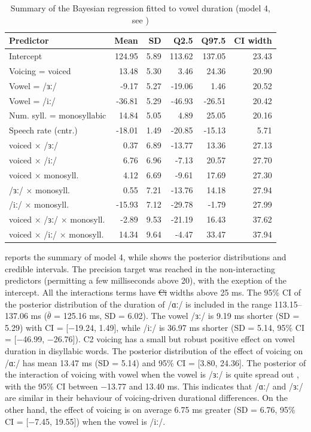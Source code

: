 \documentclass[12pt,a4paper,]{article}
\providecommand{\DIFaddtex}[1]{{\protect\color{blue}\uwave{#1}}} %
\providecommand{\DIFdeltex}[1]{{\protect\color{red}\sout{#1}}}                      %
\providecommand{\DIFaddbegin}{} %
\providecommand{\DIFaddend}{} %
\providecommand{\DIFdelbegin}{} %
\providecommand{\DIFdelend}{} %
\providecommand{\DIFadd}[1]{\texorpdfstring{\DIFaddtex{#1}}{#1}} %
\providecommand{\DIFdel}[1]{\texorpdfstring{\DIFdeltex{#1}}{}} %
\newcommand{\DIFscaledelfig}{0.5}
\newlength{\DIFdelgraphicswidth} %
\newlength{\DIFdelgraphicsheight} %
\newcommand{\DIFaddincludegraphics}[2][]{{\color{blue}\fbox{\DIFOincludegraphics[#1]{#2}}}} %
\newcommand{\DIFdelincludegraphics}[2][]{%
\sbox{\DIFdelgraphicsbox}{\DIFOincludegraphics[#1]{#2}}%
\settoboxwidth{\DIFdelgraphicswidth}{\DIFdelgraphicsbox} %
\settoboxtotalheight{\DIFdelgraphicsheight}{\DIFdelgraphicsbox} %
\scalebox{\DIFscaledelfig}{%
\parbox[b]{\DIFdelgraphicswidth}{\usebox{\DIFdelgraphicsbox}\\[-\baselineskip] \rule{\DIFdelgraphicswidth}{0em}}\llap{\resizebox{\DIFdelgraphicswidth}{\DIFdelgraphicsheight}{%
\setlength{\unitlength}{\DIFdelgraphicswidth}%
\begin{picture}(1,1)%
\thicklines\linethickness{2pt} %
{\color[rgb]{1,0,0}\put(0,0){\framebox(1,1){}}}%
{\color[rgb]{1,0,0}\put(0,0){\line( 1,1){1}}}%
{\color[rgb]{1,0,0}\put(0,1){\line(1,-1){1}}}%
\end{picture}%
}\hspace*{3pt}}} %
} %
\DeclareRobustCommand{\DIFaddbegin}{\DIFOaddbegin \let\includegraphics\DIFaddincludegraphics} %
\DeclareRobustCommand{\DIFaddend}{\DIFOaddend \let\includegraphics\DIFOincludegraphics} %
\DeclareRobustCommand{\DIFdelbegin}{\DIFOdelbegin \let\includegraphics\DIFdelincludegraphics} %
\DeclareRobustCommand{\DIFdelend}{\DIFOaddend \let\includegraphics\DIFOincludegraphics} %
\begin{document}
\begin{table}[t]

\caption{\label{tab:vow-4-table}Summary of the Bayesian regression fitted to vowel duration (model 4, see )}
\centering
\fontsize{8}{10}\selectfont
\begin{tabular}{lrrrrr}
\toprule
Predictor & Mean & SD & Q2.5 & Q97.5 & CI width\\
\midrule
Intercept & 124.95 & 5.89 & 113.62 & 137.05 & 23.43\\
Voicing = voiced & 13.48 & 5.30 & 3.46 & 24.36 & 20.90\\
Vowel = /ɜː/ & -9.17 & 5.27 & -19.06 & 1.46 & 20.52\\
Vowel = /iː/ & -36.81 & 5.29 & -46.93 & -26.51 & 20.42\\
Num. syll. = monosyllabic & 14.84 & 5.05 & 4.89 & 25.05 & 20.16\\
Speech rate (cntr.) & -18.01 & 1.49 & -20.85 & -15.13 & 5.71\\
voiced × /ɜː/ & 0.37 & 6.89 & -13.77 & 13.36 & 27.13\\
voiced × /iː/ & 6.76 & 6.96 & -7.13 & 20.57 & 27.70\\
voiced × monosyll. & 4.12 & 6.69 & -9.61 & 17.69 & 27.30\\
/ɜː/ × monosyll. & 0.55 & 7.21 & -13.76 & 14.18 & 27.94\\
/iː/ × monosyll. & -15.93 & 7.12 & -29.78 & -1.79 & 27.99\\
voiced × /ɜː/ × monosyll. & -2.89 & 9.53 & -21.19 & 16.43 & 37.62\\
voiced × /iː/ × monosyll. & 14.34 & 9.64 & -4.47 & 33.47 & 37.94\\
\bottomrule
\end{tabular}
\end{table}

 reports the summary of model 4, while
 shows the posterior distributions and credible
intervals. The precision target was reached in the non-interacting
predictors (permitting a few milliseconds above 20), with the exeption
of the intercept. All the interactions terms have \DIFdelbegin \DIFdel{Ci }\DIFdelend \DIFaddbegin \DIFadd{CI }\DIFaddend widths above 25 ms.
The 95\% CI of the posterior distribution of the duration of /ɑː/ is
included in the range 113.15--137.06 ms (\(\bar{\theta}\) = 125.16 ms,
SD = 6.02). The vowel /ɜː/ is 9.19 ms shorter (SD = 5.29) with CI =
{[}−19.24, 1.49{]}, while /iː/ is 36.97 ms shorter (SD = 5.14, 95\% CI =
{[}−46.99, −26.76{]}). C2 voicing has a small but robust positive effect
on vowel duration in disyllabic words. The posterior distribution of the
effect of voicing on /ɑː/ has mean 13.47 ms (SD = 5.14) and 95\% CI =
{[}3.80, 24.36{]}. The posterior of the interaction of voicing with
vowel when the vowel is /ɜː/ is quite spread out \DIFaddbegin \DIFadd{around 0}\DIFaddend , with the 95\%
CI between −13.77 and 13.40 ms. This indicates that /ɑː/ and /ɜː/ are
similar in their behaviour of voicing-driven durational differences. On
the other hand, the effect of voicing is on average 6.75 ms greater (SD
= 6.76, 95\% CI = {[}−7.45, 19.55{]}) when the vowel is /iː/.
\end{document}
